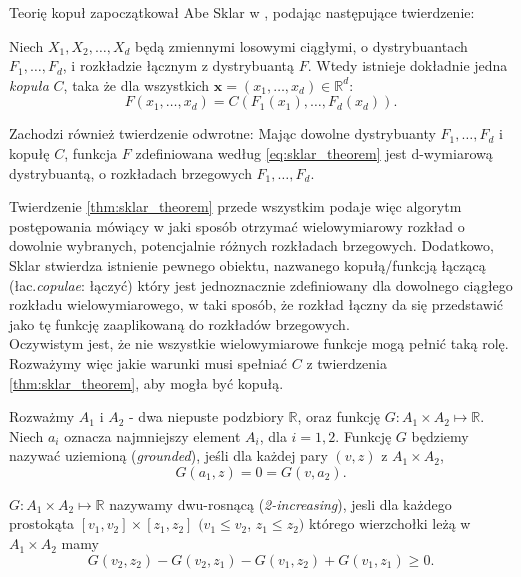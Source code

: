 Teorię kopuł zapoczątkował Abe Sklar w \cite{Sklar_Theorem}, podając następujące twierdzenie:

\begin{thm}
	Niech $X_1, X_2, \dots, X_d$ będą zmiennymi losowymi ciągłymi, o dystrybuantach $F_1, \dots, F_d$, i rozkładzie łącznym z dystrybuantą $F$. Wtedy istnieje dokładnie jedna \emph{kopuła} $C$, taka że dla wszystkich $\mathbf{x} = (x_1, \dots, x_d) \in \mathbb{R}^d$:
	\begin{equation}
		F(x_1, \dots, x_d) = C(F_1(x_1), \dots, F_d(x_d)).
		\label{eq:sklar_theorem}
	\end{equation}
	
	Zachodzi również twierdzenie odwrotne: Mając dowolne dystrybuanty $F_1, \dots, F_d$ i kopułę $C$, funkcja $F$ zdefiniowana według \ref{eq:sklar_theorem} jest d-wymiarową dystrybuantą, o rozkładach brzegowych $F_1, \dots, F_d$. 
	\label{thm:sklar_theorem}
\end{thm}

Twierdzenie \ref{thm:sklar_theorem} przede wszystkim podaje więc algorytm postępowania mówiący w jaki sposób otrzymać wielowymiarowy rozkład o dowolnie wybranych, potencjalnie różnych rozkładach brzegowych. Dodatkowo, Sklar stwierdza istnienie pewnego obiektu, nazwanego kopułą/funkcją łączącą (łac.\emph{copulae}: łączyć) który jest jednoznacznie zdefiniowany dla dowolnego ciągłego rozkładu wielowymiarowego, w taki sposób, że rozkład łączny da się przedstawić jako tę funkcję zaaplikowaną do rozkładów brzegowych.\\

Oczywistym jest, że nie wszystkie wielowymiarowe funkcje mogą pełnić taką rolę. Rozważymy więc jakie warunki musi spełniać $C$ z twierdzenia \ref{thm:sklar_theorem}, aby mogła być kopułą.
\begin{df}
	Rozważmy $A_1$ i $A_2$ - dwa niepuste podzbiory $\mathbb{R}$, oraz funkcję $G\colon A_1\times A_2\mapsto\mathbb{R}$. Niech $a_i$ oznacza najmniejszy element $A_i$, dla $i=1, 2$. Funkcję $G$ będziemy nazywać uziemioną (\emph{grounded}), jeśli dla każdej pary $(v, z)$ z $A_1\times A_2$,
	\begin{equation}
		G(a_1, z) = 0 = G(v, a_2).
	\end{equation}
	\label{def:grounded_function}
\end{df}

\begin{df}
	$G\colon A_1\times A_2\mapsto \mathbb{R}$ nazywamy dwu-rosnącą (\emph{2-increasing}), jesli dla każdego prostokąta $[v_1, v_2]\times [z_1, z_2]$ $(v_1 \leqslant v_2$, $z_1\leqslant z_2)$ którego wierzchołki leżą w $A_1 \times A_2$ mamy
	\begin{equation}
		G(v_2, z_2) - G(v_2, z_1) - G(v_1, z_2) + G(v_1, z_1) \geqslant 0.
	\end{equation}
	\label{def:two_increasing_function}
\end{df}

